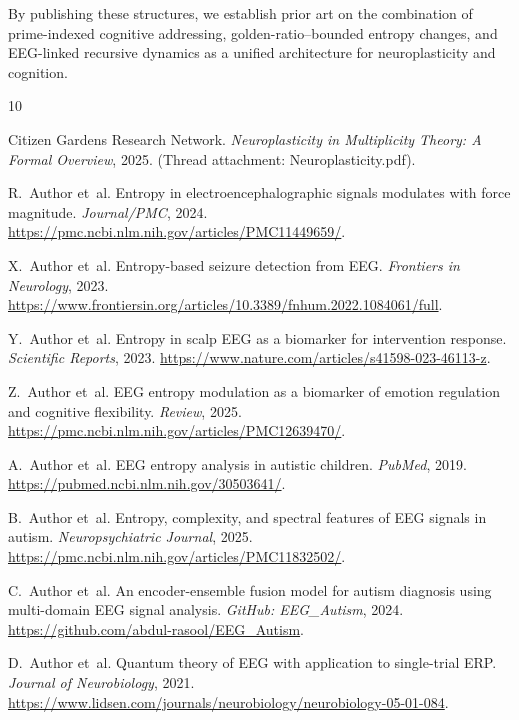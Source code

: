 \documentclass[11pt]{article}
\begin{document}
By publishing these structures, we establish prior art on the combination of prime-indexed cognitive addressing, golden-ratio--bounded entropy changes, and EEG-linked recursive dynamics as a unified architecture for neuroplasticity and cognition.


\begin{thebibliography}{10}

Citizen Gardens Research Network.
\newblock \emph{Neuroplasticity in Multiplicity Theory: A Formal Overview}, 2025.
\newblock (Thread attachment: Neuroplasticity.pdf).

R.~Author et~al.
\newblock Entropy in electroencephalographic signals modulates with force magnitude.
\newblock \emph{Journal/PMC}, 2024. \url{https://pmc.ncbi.nlm.nih.gov/articles/PMC11449659/}.

X.~Author et~al.
\newblock Entropy-based seizure detection from EEG.
\newblock \emph{Frontiers in Neurology}, 2023. \url{https://www.frontiersin.org/articles/10.3389/fnhum.2022.1084061/full}.

Y.~Author et~al.
\newblock Entropy in scalp EEG as a biomarker for intervention response.
\newblock \emph{Scientific Reports}, 2023. \url{https://www.nature.com/articles/s41598-023-46113-z}.

Z.~Author et~al.
\newblock EEG entropy modulation as a biomarker of emotion regulation and cognitive flexibility.
\newblock \emph{Review}, 2025. \url{https://pmc.ncbi.nlm.nih.gov/articles/PMC12639470/}.

A.~Author et~al.
\newblock EEG entropy analysis in autistic children.
\newblock \emph{PubMed}, 2019. \url{https://pubmed.ncbi.nlm.nih.gov/30503641/}.

B.~Author et~al.
\newblock Entropy, complexity, and spectral features of EEG signals in autism.
\newblock \emph{Neuropsychiatric Journal}, 2025. \url{https://pmc.ncbi.nlm.nih.gov/articles/PMC11832502/}.

C.~Author et~al.
\newblock An encoder-ensemble fusion model for autism diagnosis using multi-domain EEG signal analysis.
\newblock \emph{GitHub: EEG\_Autism}, 2024. \url{https://github.com/abdul-rasool/EEG_Autism}.

D.~Author et~al.
\newblock Quantum theory of EEG with application to single-trial ERP.
\newblock \emph{Journal of Neurobiology}, 2021. \url{https://www.lidsen.com/journals/neurobiology/neurobiology-05-01-084}.


\end{thebibliography}
\end{document}
